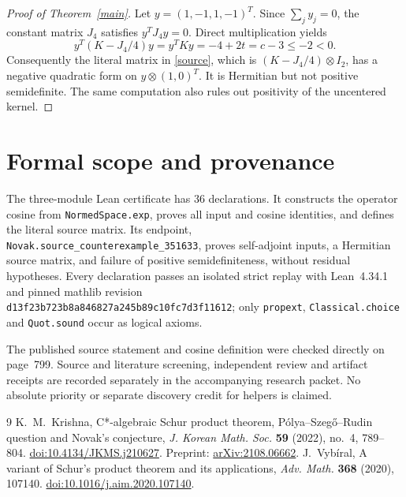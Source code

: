 \documentclass[11pt]{article}
\newcommand{\I}{I_2}
\begin{document}
\begin{proof}[Proof of Theorem~\ref{main}]
Let $y=(1,-1,1,-1)^T$. Since $\sum_j y_j=0$, the constant matrix
$J_4$ satisfies $y^TJ_4y=0$. Direct multiplication yields
\[
 y^T(K-J_4/4)y=y^TKy=-4+2t=c-3\leq-2<0.
\]
Consequently the literal matrix in \eqref{source}, which is
$(K-J_4/4)\otimes\I$, has a negative quadratic form on
$y\otimes(1,0)^T$. It is Hermitian but not positive semidefinite.
The same computation also rules out positivity of the uncentered kernel.
\end{proof}

\section{Formal scope and provenance}
The three-module Lean certificate has 36 declarations. It constructs the
operator cosine from \texttt{NormedSpace.exp}, proves all input and cosine
identities, and defines the literal source matrix. Its endpoint,\\
\texttt{Novak.source\_counterexample\_351633}, proves self-adjoint inputs,
a Hermitian source matrix, and failure of positive semidefiniteness,
without residual hypotheses. Every declaration passes an isolated strict
replay with Lean~4.34.1 and pinned mathlib revision\\
\texttt{d13f23b723b8a846827a245b89c10fc7d3f11612}; only
\texttt{propext}, \texttt{Classical.choice} and \texttt{Quot.sound} occur
as logical axioms.

The published source statement and cosine definition were checked directly
on page~799. Source and literature screening, independent review and
artifact receipts are recorded separately in the accompanying research
packet. No absolute priority or separate discovery credit for helpers is
claimed.

\begin{thebibliography}{9}
 K.~M.~Krishna,
C*-algebraic Schur product theorem, P\'olya--Szeg\H{o}--Rudin question
and Novak's conjecture,
\emph{J. Korean Math. Soc.} \textbf{59} (2022), no.~4, 789--804.
\href{https://doi.org/10.4134/JKMS.j210627}{doi:10.4134/JKMS.j210627}.
Preprint: \href{https://arxiv.org/abs/2108.06662}{arXiv:2108.06662}.
 J.~Vyb\'iral,
A variant of Schur's product theorem and its applications,
\emph{Adv. Math.} \textbf{368} (2020), 107140.
\href{https://doi.org/10.1016/j.aim.2020.107140}{doi:10.1016/j.aim.2020.107140}.
\end{thebibliography}
\end{document}
